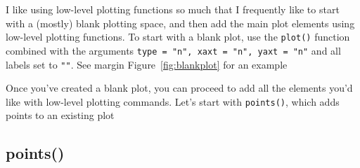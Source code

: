 \documentclass{tufte-book}\usepackage[]{graphicx}\usepackage[]{color}
\makeatletter
\newcommand{\hlnum}[1]{\textcolor[rgb]{0.686,0.059,0.569}{#1}}%
\newcommand{\hlstr}[1]{\textcolor[rgb]{0.192,0.494,0.8}{#1}}%
\newcommand{\hlcom}[1]{\textcolor[rgb]{0.678,0.584,0.686}{\textit{#1}}}%
\newcommand{\hlopt}[1]{\textcolor[rgb]{0,0,0}{#1}}%
\newcommand{\hlstd}[1]{\textcolor[rgb]{0.345,0.345,0.345}{#1}}%
\newcommand{\hlkwb}[1]{\textcolor[rgb]{0.69,0.353,0.396}{#1}}%
\newcommand{\hlkwc}[1]{\textcolor[rgb]{0.333,0.667,0.333}{#1}}%
\newcommand{\hlkwd}[1]{\textcolor[rgb]{0.737,0.353,0.396}{\textbf{#1}}}%
\newenvironment{kframe}{%
 \def\at@end@of@kframe{}%
 \ifinner\ifhmode%
  \def\at@end@of@kframe{\end{minipage}}%
  \begin{minipage}{\columnwidth}%
 \fi\fi%
 \def\FrameCommand##1{\hskip\@totalleftmargin \hskip-\fboxsep
 \colorbox{shadecolor}{##1}\hskip-\fboxsep
     \hskip-\linewidth \hskip-\@totalleftmargin \hskip\columnwidth}%
 \MakeFramed {\advance\hsize-\width
   \@totalleftmargin\z@ \linewidth\hsize
   \@setminipage}}%
 {\par\unskip\endMakeFramed%
 \at@end@of@kframe}
\newenvironment{knitrout}{}{} %
\makeatother
\begin{document}
\begin{footnotesize}
I like using low-level plotting functions so much that I frequently like to start with a (mostly) blank plotting space, and then add the main plot elements using low-level plotting functions. To start with a blank plot, use the \texttt{plot()} function combined with the arguments \texttt{type = "n", xaxt = "n", yaxt = "n"} and all labels set to \texttt{""}. See margin Figure~\ref{fig:blankplot} for an example

Once you've created a blank plot, you can proceed to add all the elements you'd like with low-level plotting commands. Let's start with \texttt{points()}, which adds points to an existing plot

\subsection{points()}


\begin{marginfigure}
\end{marginfigure}
\end{footnotesize}
\end{document}
